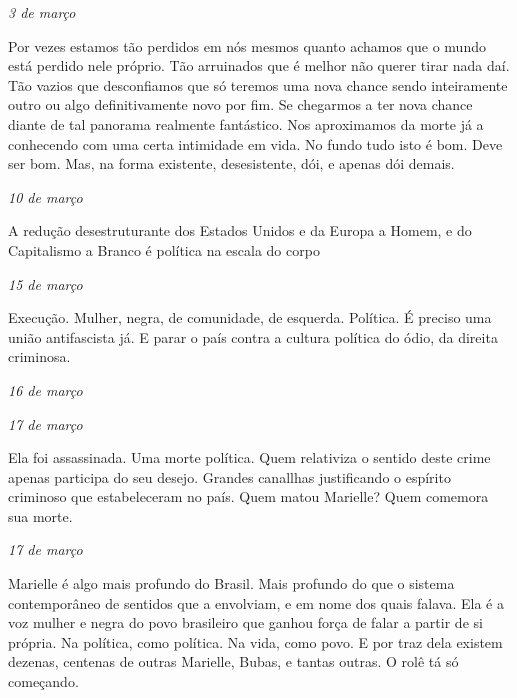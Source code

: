 \begin{flushright}
\emph{3 de março}
\end{flushright}

Por vezes estamos tão perdidos em nós mesmos quanto achamos que o mundo
está perdido nele próprio. Tão arruinados que é melhor não querer tirar
nada daí. Tão vazios que desconfiamos que só teremos uma nova chance
sendo inteiramente outro ou algo definitivamente novo por fim. Se
chegarmos a ter nova chance diante de tal panorama realmente fantástico.
Nos aproximamos da morte já a conhecendo com uma certa intimidade em
vida. No fundo tudo isto é bom. Deve ser bom. Mas, na forma existente,
desesistente, dói, e apenas dói demais.

\begin{flushright}
\emph{10 de março}
\end{flushright}

A redução desestruturante dos Estados Unidos e da Europa a Homem, e do
Capitalismo a Branco é política na escala do corpo

\begin{flushright}
\emph{15 de março}
\end{flushright}

Execução. Mulher, negra, de comunidade, de esquerda. Política. É preciso
uma união antifascista já. E parar o país contra a cultura política do
ódio, da direita criminosa.

\begin{flushright}
\emph{16 de março}
\end{flushright}

\begin{flushright}
\emph{17 de março}
\end{flushright}

Ela foi assassinada. Uma morte política. Quem relativiza o sentido deste
crime apenas participa do seu desejo. Grandes canallhas justificando o
espírito criminoso que estabeleceram no país. Quem matou Marielle? Quem
comemora sua morte.

\begin{flushright}
\emph{17 de março}
\end{flushright}

Marielle é algo mais profundo do Brasil. Mais profundo do que o sistema
contemporâneo de sentidos que a envolviam, e em nome dos quais falava.
Ela é a voz mulher e negra do povo brasileiro que ganhou força de falar
a partir de si própria. Na política, como política. Na vida, como povo.
E por traz dela existem dezenas, centenas de outras Marielle, Bubas, e
tantas outras. O rolê tá só começando.

